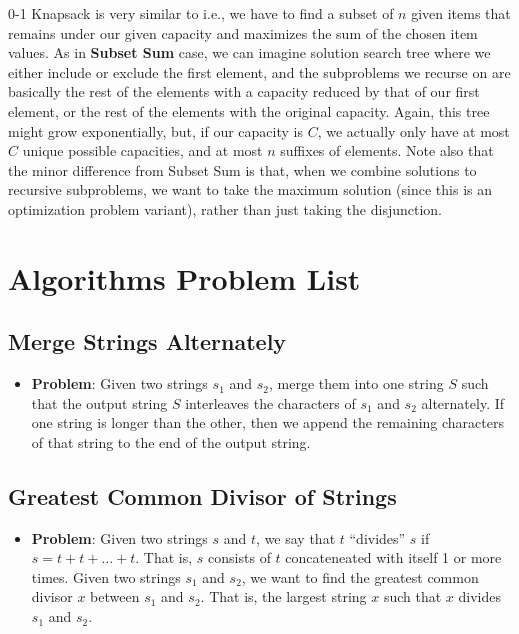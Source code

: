 \documentclass[10pt,a4paper]{article}
\begin{document}
0-1 Knapsack is very similar to  i.e., we have to find a subset of $n$ given items that remains under our given capacity and maximizes the sum of the chosen item values. As in \textbf{Subset Sum} case, we can imagine solution search tree where we either include or exclude the first element, and the subproblems we recurse on are basically the rest of the elements with a capacity reduced by that of our first element, or the rest of the elements with the original capacity. Again, this tree might grow exponentially, but, if our capacity is $C$, we actually only have at most $C$ unique possible capacities, and at most $n$ suffixes of elements. Note also that the minor difference from Subset Sum is that, when we combine solutions to recursive subproblems, we want to take the maximum solution (since this is an optimization problem variant), rather than just taking the disjunction.

\section*{Algorithms Problem List}

\subsection*{Merge Strings Alternately}
\begin{itemize}
    \item \textbf{Problem}: Given two strings $s_1$ and $s_2$, merge them into one string $S$ such that the output string $S$ interleaves the characters of $s_1$ and $s_2$ alternately. If one string is longer than the other, then we append the remaining characters of that string to the end of the output string.
\end{itemize}


\subsection*{Greatest Common Divisor of Strings}
\begin{itemize}
    \item \textbf{Problem}: Given two strings $s$ and $t$, we say that $t$ ``divides'' $s$ if $s = t + t + \dots + t$. That is, $s$ consists of $t$ concateneated with  itself 1 or more times. Given two strings $s_1$ and $s_2$, we want to find the greatest common divisor $x$ between $s_1$ and $s_2$. That is, the largest string $x$ such that $x$ divides $s_1$ and $s_2$.
\end{itemize}
\end{document}
